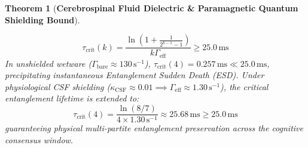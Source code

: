 \documentclass[10pt,twocolumn,3p]{article}
\newtheorem{theorem}{Theorem}
\begin{document}
\begin{theorem}[\textbf{Cerebrospinal Fluid Dielectric \& Paramagnetic Quantum Shielding Bound}]
\begin{enumerate}
    \begin{equation}
        \tau_{\text{crit}}(k) = \frac{\ln\left(1 + \frac{1}{2^{k-1}-1}\right)}{k \Gamma_{\text{eff}}} \ge 25.0\,\text{ms}
    \end{equation}
    In unshielded wetware ($\Gamma_{\text{bare}} \approx 130\,\text{s}^{-1}$), $\tau_{\text{crit}}(4) = 0.257\,\text{ms} \ll 25.0\,\text{ms}$, precipitating instantaneous Entanglement Sudden Death (ESD). Under physiological CSF shielding ($\kappa_{\text{CSF}} \approx 0.01 \implies \Gamma_{\text{eff}} \approx 1.30\,\text{s}^{-1}$), the critical entanglement lifetime is extended to:
    \begin{equation}
        \tau_{\text{crit}}(4) = \frac{\ln(8/7)}{4 \times 1.30\,\text{s}^{-1}} \approx 25.68\,\text{ms} \ge 25.0\,\text{ms}
    \end{equation}
    guaranteeing physical multi-partite entanglement preservation across the cognitive consensus window.
\end{enumerate}
\end{theorem}
\end{document}
